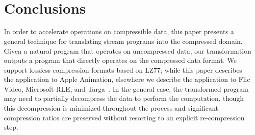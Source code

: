 \newpage
\mbox{~} \\ ~ \vspace{-70pt} ~ \\
\section{Conclusions} \vspace{-1pt}
\label{sec:conclusions}


In order to accelerate operations on compressible data, this paper
presents a general technique for translating stream programs into the
compressed domain.  Given a natural program that operates on
uncompressed data, our transformation outputs a program that directly
operates on the compressed data format.  We support lossless
compression formats based on LZ77; while this paper describes the
application to Apple Animation, elsewhere we describe the application
to Flic Video, Microsoft RLE, and Targa~\cite{techreport}.  In the
general case, the transformed program may need to partially decompress
the data to perform the computation, though this decompression is
minimized throughout the process and significant compression ratios
are preserved without resorting to an explicit re-compression step.


